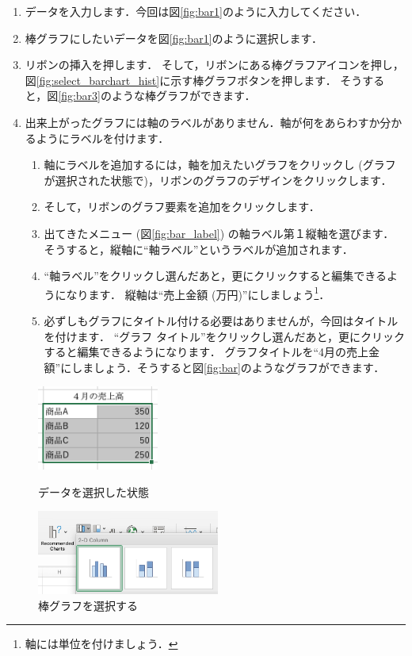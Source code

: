 \begin{enumerate}
    \item データを入力します．今回は図\ref{fig:bar1}のように入力してください．
    \item 棒グラフにしたいデータを図\ref{fig:bar1}のように選択します．
    \item リボンの挿入を押します．
    そして，リボンにある棒グラフアイコンを押し，図\ref{fig:select_barchart_hist}に示す棒グラフボタンを押します．
    そうすると，図\ref{fig:bar3}のような棒グラフができます．
    \item 出来上がったグラフには軸のラベルがありません．軸が何をあらわすか分かるようにラベルを付けます．
    \begin{enumerate}
        \item 軸にラベルを追加するには，軸を加えたいグラフをクリックし (グラフが選択された状態で)，リボンのグラフのデザインをクリックします．
        \item そして，リボンのグラフ要素を追加をクリックします．
        \item 出てきたメニュー (図\ref{fig:bar_label}) の軸ラベル第１縦軸を選びます．
        そうすると，縦軸に``軸ラベル''というラベルが追加されます．
        \item ``軸ラベル''をクリックし選んだあと，更にクリックすると編集できるようになります．
        縦軸は``売上金額 (万円)''にしましょう\footnote{軸には単位を付けましょう．}．
        \item 必ずしもグラフにタイトル付ける必要はありませんが，今回はタイトルを付けます．
        ``グラフ タイトル''をクリックし選んだあと，更にクリックすると編集できるようになります．
        グラフタイトルを``4月の売上金額''にしましょう．そうすると図\ref{fig:bar}のようなグラフができます．
    \end{enumerate}
\end{enumerate}

\begin{figure}[tb]
    \begin{minipage}{0.5\hsize}
        \centering
        \includegraphics[width=4cm]{chap2/bar1.png}
        \caption{データを選択した状態}
        \label{fig:bar1}
    \end{minipage}
    \begin{minipage}{0.5\hsize}
        \centering
        \includegraphics[width=6cm]{chap2/bar2.png}
        \caption{棒グラフを選択する}
        \label{fig:bar2}
    \end{minipage}
\end{figure}

